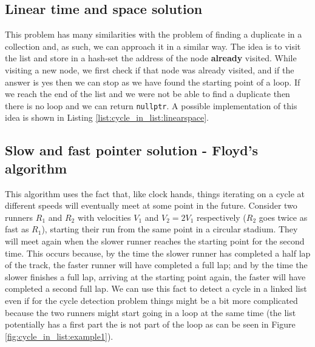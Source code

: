 \subsection{Linear time and space solution}
\label{cycle_in_list:sec:bruteforce}
This problem has many similarities with the problem of finding a duplicate in a collection and, as such, we can approach it in a similar way. The idea is to visit the list and store in a hash-set
the  address of the node \textbf{already} visited. While visiting a new node, we first check if that
node was already visited, and if the answer is yes then we can stop as we have found the starting point
of a loop. If we reach the end of the list and we were not be able to find a duplicate then there is no loop and we can return \lstinline[columns=fixed]{nullptr}. A possible
implementation of this idea is shown in Listing \ref{list:cycle_in_list:linearspace}.





\subsection{Slow and fast pointer solution - Floyd’s algorithm }
\label{cycle_in_list:sec:slowfast}
This algorithm\cite{cit::wiki::floyd} uses the fact that, like clock hands, things iterating on a
cycle at different speeds will eventually meet at some point in the future. Consider two runners $R_1$
and $R_2$ with velocities $V_1$ and $V_2=2V_1$ respectively ($R_2$ goes twice as fast as $R_1$),
starting their run from the same point in a circular stadium. They will meet again when the slower
runner reaches the starting point for the second time. This occurs because,  by the time the slower runner has completed a
half lap of the track,  the faster runner will have completed a full lap;  and by the time the slower finishes a full lap,
arriving at the starting point again, the faster will have completed a second full lap. We can use
this fact to detect a cycle in a linked list even if for the cycle detection problem things might be
a bit more complicated because the two runners might start going in a loop at the same time (the
list potentially has a first part the is not part of the loop as can be seen in Figure
\ref{fig:cycle_in_list:example1}). 


